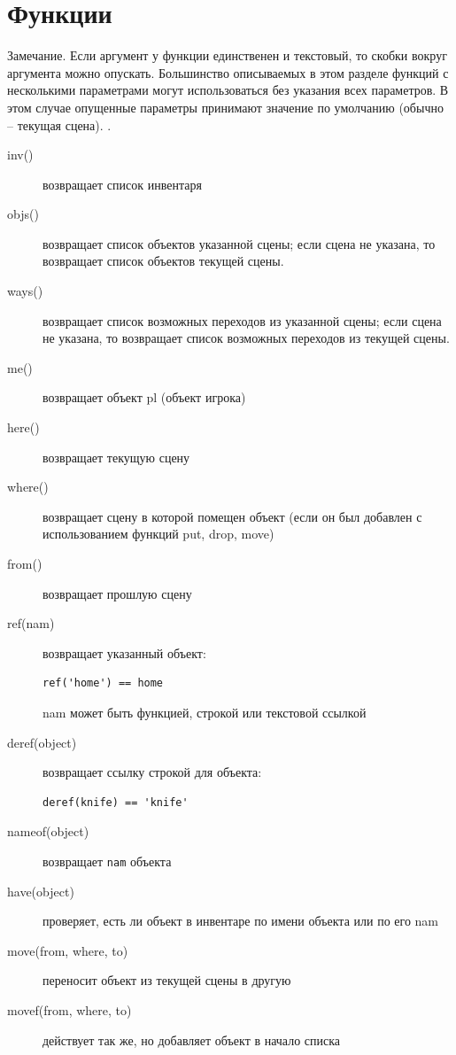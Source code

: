 \documentclass[a4paper,12pt]{article}
\begin{document}
\section{Функции}
Замечание. Если аргумент у функции единственен и текстовый, то скобки вокруг аргумента можно опускать. Большинство описываемых в этом разделе функций с несколькими параметрами могут
использоваться без указания всех параметров. В этом случае опущенные параметры принимают значение по умолчанию (обычно -- текущая сцена).
.
\begin{description}
\item[inv()]  возвращает список инвентаря
\item[objs()]  возвращает список объектов указанной сцены; если сцена не указана, то возвращает список объектов текущей сцены.
\item[ways()]  возвращает список возможных переходов из  указанной сцены; если сцена не указана, то возвращает список возможных переходов из  текущей сцены.
\item[me()]  возвращает объект pl (объект игрока)
\item[here()]  возвращает текущую сцену
\item[where()]  возвращает сцену в которой помещен объект (если он был добавлен с использованием функций put, drop, move)
\item[from()]  возвращает прошлую сцену
\item[ref(nam)]  возвращает указанный объект: \begin{verbatim}ref('home') == home\end{verbatim} nam может быть функцией, строкой или текстовой ссылкой
\item[deref(object)]  возвращает ссылку строкой для объекта: \begin{verbatim}deref(knife) == 'knife'\end{verbatim}
\item[nameof(object)]  возвращает \verb/nam/ объекта
\item[have(object)]  проверяет, есть ли объект в инвентаре по имени объекта или по его nam
\item[move(from, where, to)]  переносит объект из текущей сцены в другую
\item[movef(from, where, to)]  действует так же, но добавляет объект в начало списка

\end{description}
\end{document}
